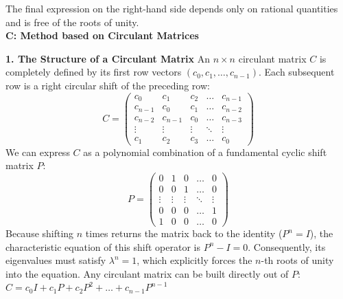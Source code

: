 The final expression on the right-hand side depends only on rational quantities and is free of the roots of unity. \\


{\bf C: Method based on Circulant Matrices}

{\bf 1. The Structure of a Circulant Matrix}
An \(n \times n\) circulant matrix \(C\) is completely defined by its first row vectors  \((c_0, c_1, \dots, c_{n-1})\). 
Each subsequent row is a right circular shift of the preceding row:
\[C=\left(\begin{matrix}c_{0}&c_{1}&c_{2}&\dots &c_{n-1}\\ c_{n-1}&c_{0}&c_{1}&\dots &c_{n-2}\\ c_{n-2}&c_{n-1}&c_{0}&\dots &c_{n-3}\\ \vdots &\vdots &\vdots &\ddots &\vdots \\ c_{1}&c_{2}&c_{3}&\dots &c_{0}\end{matrix}\right)\]
We can express \(C\) as a polynomial combination of a fundamental cyclic shift matrix 
\(P\): \[P=\left(\begin{matrix}0&1&0&\dots &0\\ 0&0&1&\dots &0\\ \vdots &\vdots &\vdots &\ddots &\vdots \\ 0&0&0&\dots &1\\ 1&0&0&\dots &0\end{matrix}\right)\]
Because shifting \(n\) times returns the matrix back to the identity (\(P^n = I\)), the characteristic equation of this shift operator is \(P^n - I = 0\). 
Consequently, its eigenvalues must satisfy \(\lambda^n = 1\), which explicitly forces the \(n\)-th roots of unity into the equation.
Any circulant matrix can be built directly out of \(P\):\(C=c_{0}I+c_{1}P+c_{2}P^{2}+\dots +c_{n-1}P^{n-1}\) \\

